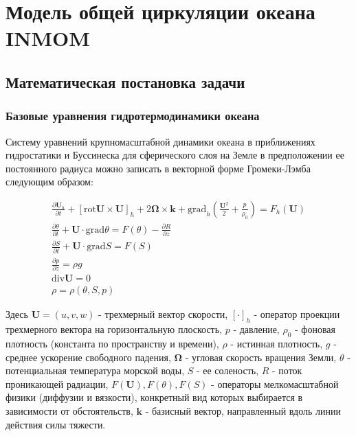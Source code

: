 \chapter{Модель общей циркуляции океана INMOM}\label{ch:inmsom/ch1}

\section{Математическая постановка задачи}\label{sec:inmsom/ch1/sec1}

\subsection{Базовые уравнения гидротермодинамики океана}
    Систему уравнений крупномасштабной динамики океана в приближениях гидростатики и Буссинеска для сферического слоя на Земле в предположении ее постоянного радиуса можно записать в векторной форме Громеки-Лэмба следующим образом:
		
	\begin{equation} \label{eq:inmsom/1} 
	\begin{array}{c} 
	\displaystyle{\frac{\partial \textbf{U}_h }{\partial t_{} } +\left[\mbox{rot}\textbf{U}\times \textbf{U}\right]_{h} +2 \mathbf{ \Omega } \times \textbf{k}+ \mbox{grad}_{h} \left(\frac{\textbf{U}^{2} }{2^{} } + \frac{p_{} }{\rho _{0} } \right)=F_{h} (\textbf{U})} \\ 
	
	\displaystyle{\frac{\partial \theta }{\partial t} +\textbf{U}\cdot \mbox{grad}\theta =F(\theta )-\frac{\partial R}{\partial z} } \\ 
	
	\displaystyle{\frac{\partial S}{\partial t} + \textbf{U}\cdot \mbox{grad}S=F(S)} \\ 
	
	\displaystyle{\frac{\partial p}{\partial z} =\rho g} \\ 
	
	\displaystyle{\mbox{div} \textbf{U}=0} \\ 
	
	\displaystyle{\rho =\rho (\theta ,S,p)} 
	\end{array} 
	\end{equation} 
	
	Здесь $\textbf{U} = (u, v, w)$ - трехмерный вектор скорости, $[\cdot]_h$ - оператор проекции трехмерного вектора на
	горизонтальную плоскость, $p$ - давление, $\rho_0$ - фоновая плотность (константа по пространству и времени),
	$\rho$ - истинная плотность, $g$ - среднее ускорение свободного падения,
	$\mathbf{ \Omega} $ - угловая скорость вращения Земли, $\theta$ - потенциальная температура морской воды, $S$ - ее соленость,
	$R$ - поток проникающей радиации, $F(\textbf{U}), F(\theta), F(S)$ - операторы мелкомасштабной физики (диффузии и вязкости), конкретный вид
	которых выбирается в зависимости от обстоятельств, $\textbf{k}$ - базисный вектор, направленный вдоль линии действия силы тяжести.
	
